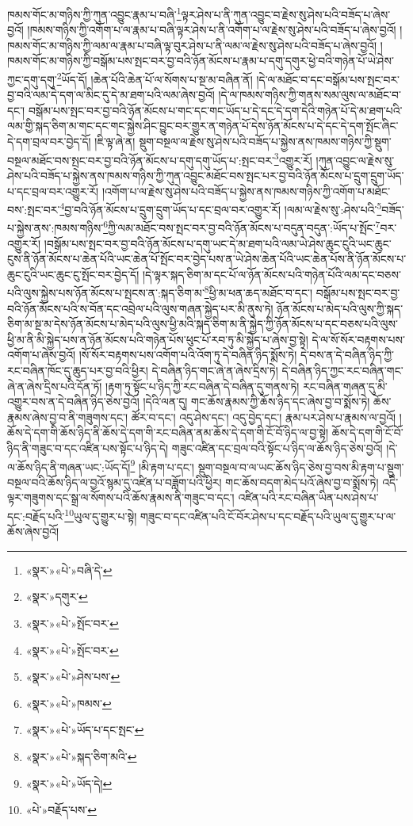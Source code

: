 ཁམས་གོང་མ་གཉིས་ཀྱི་ཀུན་འབྱུང་རྣམ་པ་བཞི་\footnote{«སྣར་»«པེ་»བཞི་དེ་}ལྟར་ཤེས་པ་ནི་ཀུན་འབྱུང་བ་རྗེས་སུ་ཤེས་པའི་བཟོད་པ་ཞེས་བྱའོ། །ཁམས་གཉིས་ཀྱི་འགོག་པ་ལ་རྣམ་པ་བཞི་ལྟར་ཤེས་པ་ནི་འགོག་པ་ལ་རྗེས་སུ་ཤེས་པའི་བཟོད་པ་ཞེས་བྱའོ། །ཁམས་གོང་མ་གཉིས་ཀྱི་ལམ་ལ་རྣམ་པ་བཞི་ལྟ་བུར་ཤེས་པ་ནི་ལམ་ལ་རྗེས་སུ་ཤེས་པའི་བཟོད་པ་ཞེས་བྱའོ། །ཁམས་གོང་མ་གཉིས་ཀྱི་བསྒོམ་པས་སྤང་བར་བྱ་བའི་ཉོན་མོངས་པ་རྣམ་པ་དགུ་དགུར་ཕྱེ་བའི་གཉེན་པོ་ཡེ་ཤེས་ཀྱང་དགུ་དགུ་\footnote{«སྣར་»དགུར་}ཡོད་དོ། །ཆེན་པོའི་ཆེན་པོ་ལ་སོགས་པ་སྔ་མ་བཞིན་ནོ། །དེ་ལ་མཐོང་བ་དང་བསྒོམ་པས་སྤང་བར་བྱ་བའི་ལམ་དེ་དག་ལ་མིང་དུ་དེ་མ་ཐག་པའི་ལམ་ཞེས་བྱའོ། །དེ་ལ་ཁམས་གཉིས་ཀྱི་གནས་སམ་ལུས་ལ་མཐོང་བ་དང་། བསྒོམ་པས་སྤང་བར་བྱ་བའི་ཉོན་མོངས་པ་གང་དང་གང་ཡོད་པ་དེ་དང་དེ་དག་དེའི་གཉེན་པོ་དེ་མ་ཐག་པའི་ལམ་གྱི་སྐད་ཅིག་མ་གང་དང་གང་སྐྱེས་ཤིང་བྱུང་བར་གྱུར་ན་གཉེན་པོ་དེས་ཉོན་མོངས་པ་དེ་དང་དེ་དག་སྤོང་ཞིང་དེ་དག་བྲལ་བར་བྱེད་དོ། །ཇི་ལྟ་ཞེ་ན། སྡུག་བསྔལ་ལ་རྗེས་སུ་ཤེས་པའི་བཟོད་པ་སྐྱེས་ནས་ཁམས་གཉིས་ཀྱི་སྡུག་བསྔལ་མཐོང་བས་སྤང་བར་བྱ་བའི་ཉོན་མོངས་པ་དགུ་དགུ་ཡོད་པ་:སྤང་བར་\footnote{«སྣར་»«པེ་»སྤོང་བར་}འགྱུར་རོ། །ཀུན་འབྱུང་ལ་རྗེས་སུ་ཤེས་པའི་བཟོད་པ་སྐྱེས་ནས་ཁམས་གཉིས་ཀྱི་ཀུན་འབྱུང་མཐོང་བས་སྤང་པར་བྱ་བའི་ཉོན་མོངས་པ་དྲུག་དྲུག་ཡོད་པ་དང་བྲལ་བར་འགྱུར་རོ། །འགོག་པ་ལ་རྗེས་སུ་ཤེས་པའི་བཟོད་པ་སྐྱེས་ནས་ཁམས་གཉིས་ཀྱི་འགོག་པ་མཐོང་བས་:སྤང་བར་\footnote{«སྣར་»«པེ་»སྤོང་བར་}བྱ་བའི་ཉོན་མོངས་པ་དྲུག་དྲུག་ཡོད་པ་དང་བྲལ་བར་འགྱུར་རོ། །ལམ་ལ་རྗེས་སུ་:ཤེས་པའི་\footnote{«སྣར་»«པེ་»ཤེས་པས་}བཟོད་པ་སྐྱེས་ནས་:ཁམས་གཉིས་\footnote{«སྣར་»«པེ་»ཁམས་}ཀྱི་ལམ་མཐོང་བས་སྤང་བར་བྱ་བའི་ཉོན་མོངས་པ་བདུན་བདུན་:ཡོད་པ་སྤོང་\footnote{«སྣར་»«པེ་»ཡོད་པ་དང་སྤང་}བར་འགྱུར་རོ། །བསྒོམ་པས་སྤང་བར་བྱ་བའི་ཉོན་མོངས་པ་དགུ་ཡང་དེ་མ་ཐག་པའི་ལམ་ཡེ་ཤེས་ཆུང་ངུའི་ཡང་ཆུང་ངུས་ནི་ཉོན་མོངས་པ་ཆེན་པོའི་ཡང་ཆེན་པོ་སྤོང་བར་བྱེད་པས་ན་ཡེ་ཤེས་ཆེན་པོའི་ཡང་ཆེན་པོས་ནི་ཉོན་མོངས་པ་ཆུང་ངུའི་ཡང་ཆུང་ངུ་སྤོང་བར་བྱེད་དོ། །དེ་ལྟར་སྐད་ཅིག་མ་དང་པོ་ལ་ཉོན་མོངས་པའི་གཉེན་པོའི་ལམ་དང་བཅས་པའི་ལུས་སྐྱེས་པས་ཉོན་མོངས་པ་སྤངས་ན་:སྐད་ཅིག་མ་\footnote{«སྣར་»«པེ་»སྐད་ཅིག་མའི་}ཕྱི་མ་ཕན་ཆད་མཐོང་བ་དང་། བསྒོམ་པས་སྤང་བར་བྱ་བའི་ཉོན་མོངས་པའི་ས་བོན་དང་འབྲེལ་པའི་ལུས་གཞན་སྐྱེད་པར་མི་ནུས་ཏེ། ཉོན་མོངས་པ་མེད་པའི་ལུས་ཀྱི་སྐད་ཅིག་མ་སྔ་མ་དེས་ཉོན་མོངས་པ་མེད་པའི་ལུས་ཕྱི་མའི་སྐད་ཅིག་མ་ནི་སྐྱེད་ཀྱི་ཉོན་མོངས་པ་དང་བཅས་པའི་ལུས་ཕྱི་མ་ནི་མི་སྐྱེད་པས་ན་ཉོན་མོངས་པའི་གཉེན་པོས་ཕུང་པོ་རབ་ཏུ་མི་སྐྱེད་པ་ཞེས་བྱ་སྟེ། དེ་ལ་སོ་སོར་བརྟགས་པས་འགོག་པ་ཞེས་བྱའོ། །སོ་སོར་བརྟགས་པས་འགོག་པའི་འོག་ཏུ་དེ་བཞིན་ཉིད་སྨོས་ཏེ། དེ་བས་ན་དེ་བཞིན་ཉིད་ཀྱི་རང་བཞིན་ཁོང་དུ་ཆུད་པར་བྱ་བའི་ཕྱིར། དེ་བཞིན་ཉིད་གང་ཞེ་ན་ཞེས་དྲིས་ཏེ། དེ་བཞིན་ཉིད་ཀྱང་རང་བཞིན་གང་ཞེ་ན་ཞེས་དྲིས་པའི་དོན་ཏོ། །རྟག་ཏུ་སྟོང་པ་ཉིད་ཀྱི་རང་བཞིན་དེ་བཞིན་དུ་གནས་ཏེ། རང་བཞིན་གཞན་དུ་མི་འགྱུར་བས་ན་དེ་བཞིན་ཉིད་ཅེས་བྱའོ། །དེའི་ལན་དུ། གང་ཆོས་རྣམས་ཀྱི་ཆོས་ཉིད་དང་ཞེས་བྱ་བ་སྨོས་ཏེ། ཆོས་རྣམས་ཞེས་བྱ་བ་ནི་གཟུགས་དང་། ཚོར་བ་དང་། འདུ་ཤེས་དང་། འདུ་བྱེད་དང་། རྣམ་པར་ཤེས་པ་རྣམས་ལ་བྱའོ། །ཆོས་དེ་དག་གི་ཆོས་ཉིད་ནི་ཆོས་དེ་དག་གི་རང་བཞིན་ནམ་ཆོས་དེ་དག་གི་ངོ་བོ་ཉིད་ལ་བྱ་སྟེ། ཆོས་དེ་དག་གི་ངོ་བོ་ཉིད་ནི་གཟུང་བ་དང་འཛིན་པས་སྟོང་པ་ཉིད་དེ། གཟུང་འཛིན་དང་བྲལ་བའི་སྟོང་པ་ཉིད་ལ་ཆོས་ཉིད་ཅེས་བྱའོ། །དེ་ལ་ཆོས་ཉིད་ནི་གཞན་ཡང་:ཡོད་དོ།\footnote{«སྣར་»«པེ་»ཡོད་དེ།} །མི་རྟག་པ་དང་། སྡུག་བསྔལ་བ་ལ་ཡང་ཆོས་ཉིད་ཅེས་བྱ་བས་མི་རྟག་པ་སྡུག་བསྔལ་བའི་ཆོས་ཉིད་ལ་བྱའོ་སྙམ་དུ་འཛིན་པ་བཟློག་པའི་ཕྱིར། གང་ཆོས་བདག་མེད་པའོ་ཞེས་བྱ་བ་སྨོས་ཏེ། འདི་ལྟར་གཟུགས་དང་སྒྲ་ལ་སོགས་པའི་ཆོས་རྣམས་ནི་གཟུང་བ་དང་། འཛིན་པའི་རང་བཞིན་ཡིན་པས་ཤེས་པ་དང་:བརྗོད་པའི་\footnote{«པེ་»བརྗོད་པས་}ཡུལ་དུ་གྱུར་པ་སྟེ། གཟུང་བ་དང་འཛིན་པའི་ངོ་བོར་ཤེས་པ་དང་བརྗོད་པའི་ཡུལ་དུ་གྱུར་པ་ལ་ཆོས་ཞེས་བྱའོ། 